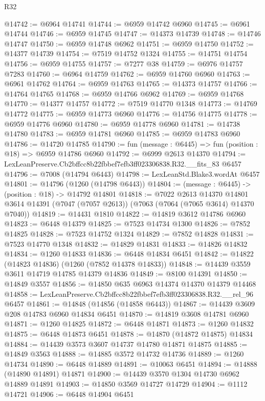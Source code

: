 \begin{lexlean}{R32}
\begin{coremodule}
@14742 := @6964 @14741
@14744 := @6959 @14742 @6960
@14745 := @6961 @14744
@14746 := @6959 @14745
@14747 := @14373 @14739
@14748 := @14746 @14747
@14750 := @6959 @14748 @6962
@14751 := @6959 @14750
@14752 := @14377 @14739
@14754 := @7519 @14752 @1324
@14755 := @14751 @14754
@14756 := @6959 @14755
@14757 := @7277 @38
@14759 := @6976 @14757 @7283
@14760 := @6964 @14759
@14762 := @6959 @14760 @6960
@14763 := @6961 @14762
@14764 := @6959 @14763
@14765 := @14373 @14757
@14766 := @14764 @14765
@14768 := @6959 @14766 @6962
@14769 := @6959 @14768
@14770 := @14377 @14757
@14772 := @7519 @14770 @1348
@14773 := @14769 @14772
@14775 := @6959 @14773 @6960
@14776 := @14756 @14775
@14778 := @6959 @14776 @6960
@14780 := @6959 @14778 @6960
@14781 := @14738 @14780
@14783 := @6959 @14781 @6960
@14785 := @6959 @14783 @6960
@14786 := @14720 @14785
@14790 := fun (message : @6445) => fun (position : @18) => @6959 @14786 @6960
@14792 := @6999 @2613 @14370
@14794 := LexLeanPreserve.Cb2bffcc8b22fbbef7efb3ff023306838.R32.__fits_83 @6457
@14796 := @7008 (@14794 @6443)
@14798 := LexLeanStd.Blake3.wordAt @6457
@14801 := @14796 (@1260 (@14798 @6443))
@14804 := (message : @6445) -> (position : @18) -> @14792 @14801
@14818 := @7022
    @2613
    @14370
    @14801
    @3614
    @14391
    (@7047 (@7057 @2613))
    (@7063 (@7064 (@7065 @3614) @14370 @7040))
@14819 := @14431 @1810
@14822 := @14819 @3612 @14786 @6960
@14823 := @6448 @14379
@14825 := @7523 @14734 @1300
@14826 := @7852 @14825
@14828 := @7523 @14752 @1324
@14829 := @7852 @14828
@14831 := @7523 @14770 @1348
@14832 := @14829 @14831
@14833 := @14826 @14832
@14834 := @1260 @14833
@14836 := @6448 @14834 @6451
@14842 := @14822 (@14823 @14836) (@1260 (@7852 @14378 @14833))
@14848 := @14439 @3559 @3611 @14719 @14785 @14379 @14836
@14849 := @8100 @14391
@14850 := @14849 @3557
@14856 := @14850 @635 @6963 @14374 @14370 @14379 @14468
@14858 := LexLeanPreserve.Cb2bffcc8b22fbbef7efb3ff023306838.R32.__rel_96 @6457
@14861 := @14848 (@14856 (@14858 @6443))
@14867 := @14439 @3609 @208 @14783 @6960 @14834 @6451
@14870 := @14819 @3608 @14781 @6960
@14871 := @1260 @14825
@14872 := @6448 @14871
@14873 := @1260 @14832
@14875 := @6448 @14873 @6451
@14878 := @14870 (@14872 @14875) @14834
@14884 := @14439 @3573 @3607 @14737 @14780 @14871 @14875
@14885 := @14849 @3563
@14888 := @14885 @3572 @14732 @14736
@14889 := @1260 @14734
@14890 := @6448 @14889
@14891 := @10063 @6451
@14894 := @14888 (@14890 @14891) @14871
@14900 := @14439 @3570 @1304 @14730 @6962 @14889 @14891
@14903 := @14850 @3569 @14727 @14729
@14904 := @1112 @14721
@14906 := @6448 @14904 @6451

\end{coremodule}
\end{lexlean}
